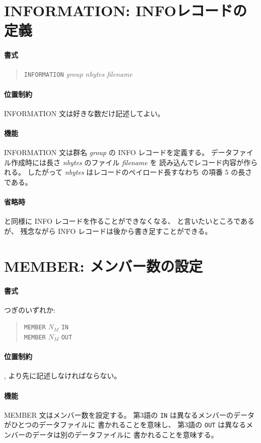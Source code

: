 \section{INFORMATION: INFOレコードの定義}
\label{sec:def:INFORMATION}
\paragraph{書式}
\begin{quote}
{\tt INFORMATION} {\it group} {\it nbytes} {\it filename}
\end{quote}
\paragraph{位置制約}
INFORMATION 文は好きな数だけ記述してよい。
\paragraph{機能}
INFORMATION 文は群名 {\it group} の INFO レコードを定義する。
データファイル作成時には長さ {\it nbytes} のファイル {\it filename} を
読み込んでレコード内容が作られる。
したがって {\it nbytes} はレコードのペイロード長すなわち
 の項番 5 の長さである。
\paragraph{省略時}
 と同様に INFO レコードを作ることができなくなる、
と言いたいところであるが、
残念ながら INFO レコードは後から書き足すことができる。

\section{MEMBER: メンバー数の設定}
\label{sec:def:MEMBER}
\paragraph{書式}
つぎのいずれか:
\begin{quote}
{\tt MEMBER} $N_M$ {\tt IN}\\
{\tt MEMBER} $N_M$ {\tt OUT}\\
\end{quote}
\paragraph{位置制約}
,
 より先に記述しなければならない。
\paragraph{機能}
MEMBER 文はメンバー数を設定する。
第3語の {\tt IN} は異なるメンバーのデータがひとつのデータファイルに
書かれることを意味し、
第3語の {\tt OUT} は異なるメンバーのデータは別のデータファイルに
書かれることを意味する。
